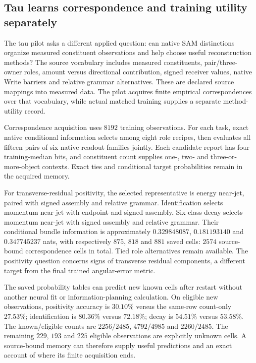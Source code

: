 \subsection{Tau learns correspondence and training utility separately}

The tau pilot asks a different applied question: can native SAM distinctions organize measured constituent observations and help choose useful reconstruction methods? The source vocabulary includes measured constituents, pair/three-owner roles, amount versus directional contribution, signed receiver values, native Write barriers and relative grammar alternatives. These are declared source mappings into measured data. The pilot acquires finite empirical correspondences over that vocabulary, while actual matched training supplies a separate method-utility record. 

Correspondence acquisition uses $8192$ training observations. For each task, exact native conditional information selects among eight role recipes, then evaluates all fifteen pairs of six native readout families jointly. Each candidate report has four training-median bits, and constituent count supplies one-, two- and three-or-more-object contexts. Exact ties and conditional target probabilities remain in the acquired memory.

For transverse-residual positivity, the selected representative is energy near-jet, paired with signed assembly and relative grammar. Identification selects momentum near-jet with endpoint and signed assembly. Six-class decay selects momentum near-jet with signed assembly and relative grammar. Their conditional bundle information is approximately $0.329848087$, $0.181193140$ and $0.347745237$ nats, with respectively $875$, $818$ and $881$ saved cells: $2574$ source-bound correspondence cells in total. Tied role alternatives remain available. The positivity question concerns signs of transverse residual components, a different target from the final trained angular-error metric.

The saved probability tables can predict new known cells after restart without another neural fit or information-planning calculation. On eligible new observations, positivity accuracy is $30.10\%$ versus the same-row count-only $27.53\%$; identification is $80.36\%$ versus $72.18\%$; decay is $54.51\%$ versus $53.58\%$. The known/eligible counts are $2256/2485$, $4792/4985$ and $2260/2485$. The remaining $229$, $193$ and $225$ eligible observations are explicitly unknown cells. A source-bound memory can therefore supply useful predictions and an exact account of where its finite acquisition ends.

